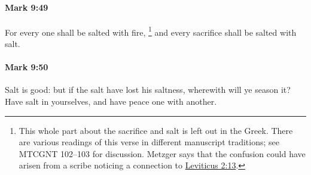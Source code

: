 		\paragraph{Mark 9:49} %
			\label{MARK-9-49}

			For every one shall be salted with fire,
				\footnote{%
					This whole part about the sacrifice and salt is left out in the Greek. There are various readings of this verse in different manuscript traditions; see MTCGNT 102--103 for discussion. Metzger says that the confusion could have arisen from a scribe noticing a connection to \hyperref[LEVITICUS-2-13]{Leviticus 2:13}.
					}%
			and every sacrifice shall be salted with salt.

			\begin{framed}
			\scriptsize
				\begin{compactdesc}
					\item[SBLG] 
				\end{compactdesc}
			\end{framed}

		\paragraph{Mark 9:50} %
			\label{MARK-9-50}

			Salt is good: but if the salt have lost his saltness, wherewith will ye season it? Have salt in yourselves, and have peace one with another.

